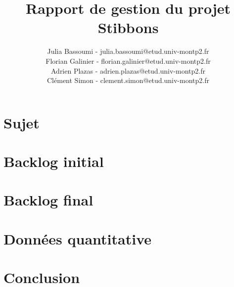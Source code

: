 \documentclass[a4paper,11pt]{report}
\title{Rapport de gestion du projet Stibbons}
\author{Julia Bassoumi - julia.bassoumi@etud.univ-montp2.fr\\Florian Galinier - florian.galinier@etud.univ-montp2.fr\\Adrien Plazas - adrien.plazas@etud.univ-montp2.fr\\Clément Simon - clement.simon@etud.univ-montp2.fr}
\begin{document}
\maketitle
\tableofcontents

\chapter{Sujet}


\chapter{Backlog initial}


\chapter{Backlog final}


\chapter{Données quantitative}


\chapter{Conclusion}

\end{document}
